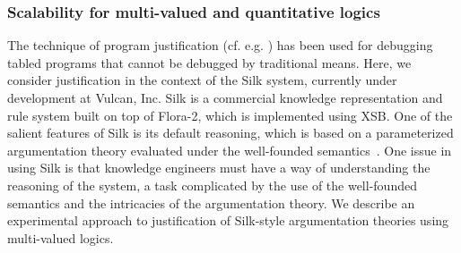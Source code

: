 \subsubsection{Scalability for multi-valued and quantitative logics} \label{sec:mv}
%
The technique of program justification (cf. e.g. \cite{PGDRR04}) has
been used for debugging tabled programs that cannot be debugged by
traditional means.  Here, we consider justification in the context of
the Silk system, currently under development at Vulcan, Inc.  Silk is
a commercial knowledge representation and rule system built on top of
Flora-2, which is implemented using XSB.  One of the salient features
of Silk is its default reasoning, which is based on a parameterized
argumentation theory evaluated under the well-founded
semantics~\cite{WGKFL09}.  One issue in using Silk is that knowledge
engineers must have a way of understanding the reasoning of the
system, a task complicated by the use of the well-founded semantics
and the intricacies of the argumentation theory.  We describe an
experimental approach to justification of Silk-style argumentation
theories using multi-valued logics.

